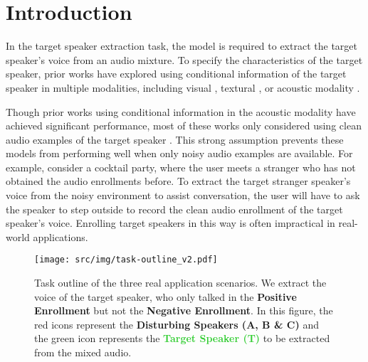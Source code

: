 \section{Introduction}
In the target speaker extraction task, the model is required to extract the target speaker's voice from an audio mixture. To specify the characteristics of the target speaker, prior works have explored using conditional information of the target speaker in multiple modalities, including visual \cite{pan2022selectivelistening, muse}, textural \cite{ma2024clapsep, typingtolistern}, or acoustic modality \cite{speakerbeam, spex, spex+, zhang2024multilevelspeakerrepresentationtarget}.

Though prior works using conditional information in the acoustic modality have achieved significant performance, most of these works only considered using clean audio examples of the target speaker \cite{he2024hierarchicalspeaker, meng2024binauralselective, zhao2024continuoustargetspeech, pham2024wannahearvoiceadaptive}. This strong assumption prevents these models from performing well when only noisy audio examples are available. For example, consider a cocktail party, where the user meets a stranger who has not obtained the audio enrollments before. To extract the target stranger speaker's voice from the noisy environment to assist conversation, the user will have to ask the speaker to step outside to record the clean audio enrollment of the target speaker's voice. Enrolling target speakers in this way is often impractical in real-world applications.

\begin{figure}[!t]
\begin{center}
\centerline{\texttt{[image: src/img/task-outline\_v2.pdf]}}
\caption{Task outline of the three real application scenarios. We extract the voice of the target speaker, who only talked in the \textbf{Positive Enrollment} but not the \textbf{Negative Enrollment}. In this figure, the red icons represent the \textcolor{red!70}{\textbf{Disturbing Speakers (A, B \& C)}} and the green icon represents the \textcolor{LimeGreen}{\textbf{Target Speaker (T)}} to be extracted from the mixed audio.}
\label{fig:task-outline}
\end{center}
\vskip -0.4in
\end{figure}

